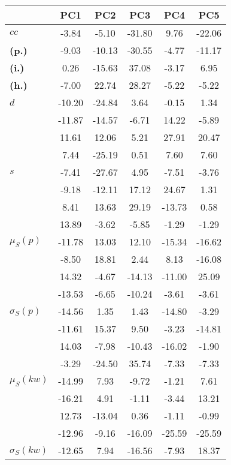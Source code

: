 \begin{table}[h!]
\begin{center}
\begin{tabular}{| l || c | c | c | c | c |}\hline
 & {\bf PC1} & {\bf PC2} & {\bf PC3} & {\bf PC4} & {\bf PC5} \\\hline\hline
{\bf $cc$} & -3.84 & -5.10 & -31.80 & 9.76 & -22.06 \\
{\bf (p.)} & -9.03 & -10.13 & -30.55 & -4.77 & -11.17 \\
{\bf (i.)} & 0.26 & -15.63 & 37.08 & -3.17 & 6.95 \\
{\bf (h.)} & -7.00 & 22.74 & 28.27 & -5.22 & -5.22 \\\hline
{\bf $d$} & -10.20 & -24.84 & 3.64 & -0.15 & 1.34 \\
{\bf } & -11.87 & -14.57 & -6.71 & 14.22 & -5.89 \\
{\bf } & 11.61 & 12.06 & 5.21 & 27.91 & 20.47 \\
{\bf } & 7.44 & -25.19 & 0.51 & 7.60 & 7.60 \\\hline
{\bf $s$} & -7.41 & -27.67 & 4.95 & -7.51 & -3.76 \\
{\bf } & -9.18 & -12.11 & 17.12 & 24.67 & 1.31 \\
 & 8.41  & 13.63  & 29.19  & -13.73  & 0.58 \\
 & 13.89  & -3.62  & -5.85  & -1.29  & -1.29 \\\hline
$\mu_S(p)$ & -11.78  & 13.03  & 12.10  & -15.34  & -16.62 \\
 & -8.50  & 18.81  & 2.44  & 8.13  & -16.08 \\
 & 14.32  & -4.67  & -14.13  & -11.00  & 25.09 \\
 & -13.53  & -6.65  & -10.24  & -3.61  & -3.61 \\\hline
$\sigma_S(p)$ & -14.56  & 1.35  & 1.43  & -14.80  & -3.29 \\
 & -11.61  & 15.37  & 9.50  & -3.23  & -14.81 \\
 & 14.03  & -7.98  & -10.43  & -16.02  & -1.90 \\
 & -3.29  & -24.50  & 35.74  & -7.33  & -7.33 \\\hline
$\mu_S(kw)$ & -14.99  & 7.93  & -9.72  & -1.21  & 7.61 \\
 & -16.21  & 4.91  & -1.11  & -3.44  & 13.21 \\
 & 12.73  & -13.04  & 0.36  & -1.11  & -0.99 \\
 & -12.96  & -9.16  & -16.09  & -25.59  & -25.59 \\\hline
$\sigma_S(kw)$ & -12.65  & 7.94  & -16.56  & -7.93  & 18.37 \\

\end{tabular}
\end{center}
\end{table}
